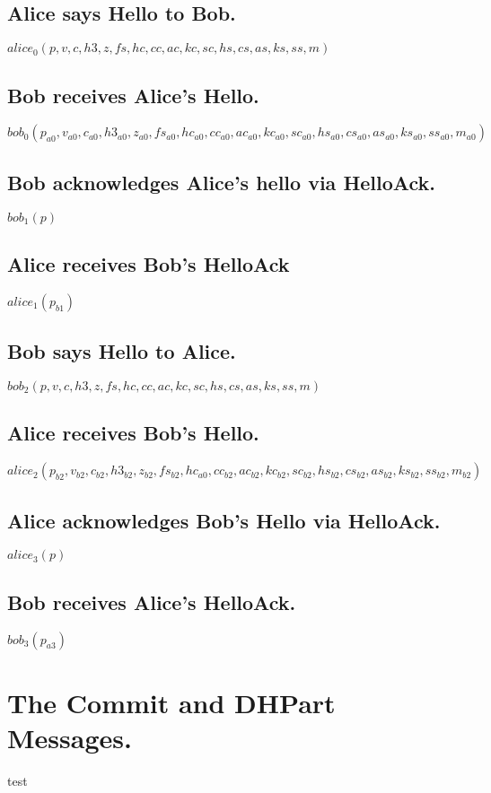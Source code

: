 \documentclass[11pt]{article}
\begin{document}
  \subsection*{Alice says Hello to Bob.}
   $alice_0(p,v,c,h3,z,fs,hc,cc,ac,kc,sc,hs,cs,as,ks,ss,m)$
  \subsection*{Bob receives Alice's Hello.}
   $bob_0(p_{a0},v_{a0},c_{a0},h3_{a0},z_{a0},fs_{a0},hc_{a0}
     ,cc_{a0},ac_{a0},kc_{a0},sc_{a0},hs_{a0},cs_{a0}
          ,as_{a0},ks_{a0},ss_{a0},m_{a0})$
  \subsection*{Bob acknowledges Alice's hello via HelloAck.}
  $bob_1(p)$
  \subsection*{Alice receives Bob's HelloAck}
  $alice_1(p_{b1})$
  \subsection*{Bob says Hello to Alice.}
  $bob_2(p,v,c,h3,z,fs,hc,cc,ac,kc,sc,hs,cs,as,ks,ss,m)$
  \subsection*{Alice receives Bob's Hello.}
   $alice_2(p_{b2},v_{b2},c_{b2},h3_{b2},z_{b2},fs_{b2},hc_{a0}
     ,cc_{b2},ac_{b2},kc_{b2},sc_{b2},hs_{b2},cs_{b2}
          ,as_{b2},ks_{b2},ss_{b2},m_{b2})$
  \subsection*{Alice acknowledges Bob's Hello via HelloAck.}
  $alice_3(p)$
  \subsection*{Bob receives Alice's HelloAck.}
  $bob_3(p_{a3})$
  \section*{The Commit and DHPart Messages.}
  test
\end{document}
